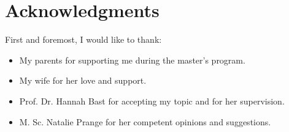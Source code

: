 \chapter*{Acknowledgments}
First and foremost, I would like to thank:
\begin{itemize}
\setlength{\itemsep}{0pt} %
\setlength{\parskip}{0pt} %
\setlength{\parsep}{0pt} %
\setlength{\topsep}{0pt} %

  \item My parents for supporting me during the master's program.
    \item My wife for her love and support.
  \item Prof. Dr. Hannah Bast for accepting my topic and for her supervision.
    \item M. Sc. Natalie Prange​ for her competent opinions and suggestions.
\end{itemize}